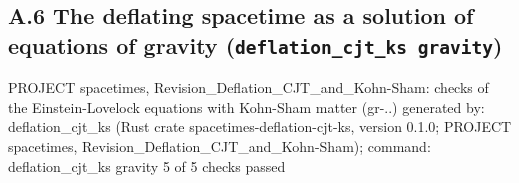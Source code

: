 \documentclass[
  10pt,
]{article}
\newenvironment{Shaded}{}{}
\newcommand{\NormalTok}[1]{#1}
\begin{document}
\hypertarget{a.6-the-deflating-spacetime-as-a-solution-of-equations-of-gravity-deflation_cjt_ks-gravity}{%
\subsection{\texorpdfstring{A.6 The deflating spacetime as a solution of
equations of gravity
(\texttt{deflation\_cjt\_ks\ gravity})}{A.6 The deflating spacetime as a solution of equations of gravity (deflation\_cjt\_ks gravity)}}\label{a.6-the-deflating-spacetime-as-a-solution-of-equations-of-gravity-deflation_cjt_ks-gravity}}

\begin{Shaded}
\begin{Highlighting}[]
\NormalTok{PROJECT spacetimes, Revision\_Deflation\_CJT\_and\_Kohn{-}Sham: checks of the Einstein{-}Lovelock equations with Kohn{-}Sham matter (gr{-}..)}
\NormalTok{generated by: deflation\_cjt\_ks (Rust crate spacetimes{-}deflation{-}cjt{-}ks, version 0.1.0; PROJECT spacetimes, Revision\_Deflation\_CJT\_and\_Kohn{-}Sham); command: deflation\_cjt\_ks gravity}
\NormalTok{5 of 5 checks passed}


\end{Highlighting}
\end{Shaded}
\end{document}
